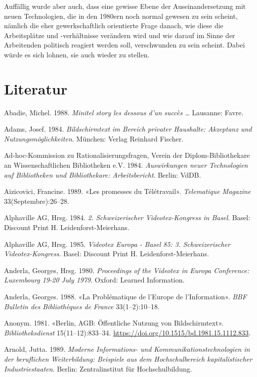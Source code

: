 \documentclass[a4paper,
fontsize=11pt,
oneside,
numbers=noperiodatend,
parskip=half-,
bibliography=totoc,
final
]{scrartcl}
\begin{document}
Auffällig wurde aber auch, dass eine gewisse Ebene der
Auseinandersetzung mit neuen Technologien, die in den 1980ern noch
normal gewesen zu sein scheint, nämlich die eher gewerkschaftlich
orientierte Frage danach, wie diese die Arbeitsplätze und -verhältnisse
verändern wird und wie darauf im Sinne der Arbeitenden politisch
reagiert werden soll, verschwunden zu sein scheint. Dabei würde es sich
lohnen, sie auch wieder zu stellen.

\hypertarget{literatur}{%
\section{Literatur}\label{literatur}}

Abadie, Michel. 1988. \emph{Minitel story les dessous d'un succès
\ldots{}} Lausanne: Favre.

Adams, Josef. 1984. \emph{Bildschirmtext im Bereich privater Haushalte:
Akzeptanz und Nutzungsmöglichkeiten}. München: Verlag Reinhard Fischer.

Ad-hoc-Kommission zu Rationalisierungsfragen, Verein der
Diplom-Bibliothekare an Wissenschaftlichen Bibliotheken e.V. 1984.
\emph{Auswirkungen neuer Technologien auf Bibliotheken und
Bibliothekare: Arbeitsbericht}. Berlin: VdDB.

Aizicovici, Francine. 1989. «Les promesses du Télétravail».
\emph{Telematique Magazine} 33(Septembre):26--28.

Alphaville AG, Hrsg. 1984. \emph{2. Schweizerischer Videotex-Kongress in
Basel}. Basel: Discount Print H. Leidenforst-Meierhans.

Alphaville AG, Hrsg. 1985. \emph{Videotex Europa - Basel 85: 3.
Schweizerischer Videotex-Kongress}. Basel: Discount Print H.
Leidenforst-Meierhans.

Anderla, Georges, Hrsg. 1980. \emph{Proceedings of the Videotex in
Europa Conference: Luxembourg 19-20 July 1979}. Oxford: Learned
Information.

Anderla, Georges. 1988. «La Problématique de l'Europe de l'Information».
\emph{BBF Bulletin des Bibliothèques de France} 33(1--2):10--18.

Anonym. 1981. «Berlin, AGB: Öffentliche Nutzung von Bildschirmtext».
\emph{Bibliotheksdienst} 15(11--12):833--34.
\url{https://doi.org/10.1515/bd.1981.15.1112.833}.

Arnold, Jutta. 1989. \emph{Moderne Informations- und
Kommunikationstechnologien in der beruflichen Weiterbildung: Beispiele
aus dem Hochschulbereich kapitalistischer Industriestaaten}. Berlin:
Zentralinstitut für Hochschulbildung.
\end{document}
